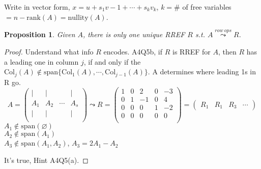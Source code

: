 \documentclass[12pt]{article}
\newtheorem{proposition}{Proposition}[subsection]
\newcommand{\Span}{\mathrm{span}}
\newcommand{\rank}{\mathrm{rank}}
\newcommand{\nullity}{\mathrm{nullity}}
\newcommand{\Col}{\mathrm{Col}}
\begin{document}
Write in vector form, $x = u + s_1v-1 + \cdots + s_kv_k$, $k = \#$ of free
variables $= n - \rank(A) = \nullity(A)$. \\

\begin{proposition}
	Given $A$, there is only one unique RREF $R$ s.t. 
	$A\overset{row \ ops} {\leadsto} R$.
\end{proposition}
\begin{proof}
	Understand what info $R$ encodes. 
	A4Q5b, if $R$ is RREF for $A$, then $R$ has a leading one in column $j$,
	if and only if the $\Col_j(A)\not \in \Span\{\Col_1(A), \cdots,
	\Col_{j-1}(A)\}$.
	A determines where leading 1s in R go. 
	\[
		A = 
		\begin{pmatrix}
			| & | & & |	\\
			A_1 & A_2 & \cdots & A_s	\\
			| & | & & |	\\
		\end{pmatrix}
		\leadsto
		R = 
		\begin{pmatrix}
			1 & 0 & 2 & 0 & -3	\\
			0 & 1 & -1 & 0 & 4	\\
			0 & 0 & 0 & 1 & -2	\\
			0 & 0 & 0 & 0 & 0	\\
		\end{pmatrix}
		=
		\begin{pmatrix}
			R_1 & R_1 & R_3 & \cdots 
		\end{pmatrix}
	\]
	$A_1 \not \in \Span(\varnothing)$\\
	$A_2 \not \in \Span(A_1)$\\
	$A_3 \not \in \Span(A_1, A_2)$, $A_3 = 2A_1 - A_2$
	
	It's true, Hint A4Q5(a). 
\end{proof}


\newpage
\end{document}
